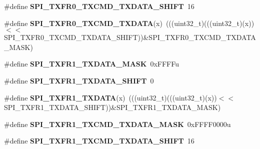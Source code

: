 \begin{DoxyCompactItemize}
\item 
\#define {\bfseries S\+P\+I\+\_\+\+T\+X\+F\+R0\+\_\+\+T\+X\+C\+M\+D\+\_\+\+T\+X\+D\+A\+T\+A\+\_\+\+S\+H\+I\+FT}~16\hypertarget{group__SPI__Register__Masks_gad5b1e75e9410e41d3c81384798040284}{}\label{group__SPI__Register__Masks_gad5b1e75e9410e41d3c81384798040284}

\item 
\#define {\bfseries S\+P\+I\+\_\+\+T\+X\+F\+R0\+\_\+\+T\+X\+C\+M\+D\+\_\+\+T\+X\+D\+A\+TA}(x)~(((uint32\+\_\+t)(((uint32\+\_\+t)(x))$<$$<$S\+P\+I\+\_\+\+T\+X\+F\+R0\+\_\+\+T\+X\+C\+M\+D\+\_\+\+T\+X\+D\+A\+T\+A\+\_\+\+S\+H\+I\+FT))\&S\+P\+I\+\_\+\+T\+X\+F\+R0\+\_\+\+T\+X\+C\+M\+D\+\_\+\+T\+X\+D\+A\+T\+A\+\_\+\+M\+A\+SK)\hypertarget{group__SPI__Register__Masks_ga7534e83201b7ea6c7beb55f2ed16ecaa}{}\label{group__SPI__Register__Masks_ga7534e83201b7ea6c7beb55f2ed16ecaa}

\item 
\#define {\bfseries S\+P\+I\+\_\+\+T\+X\+F\+R1\+\_\+\+T\+X\+D\+A\+T\+A\+\_\+\+M\+A\+SK}~0x\+F\+F\+F\+Fu\hypertarget{group__SPI__Register__Masks_ga1264b5c9bd3d50782925741457405b2d}{}\label{group__SPI__Register__Masks_ga1264b5c9bd3d50782925741457405b2d}

\item 
\#define {\bfseries S\+P\+I\+\_\+\+T\+X\+F\+R1\+\_\+\+T\+X\+D\+A\+T\+A\+\_\+\+S\+H\+I\+FT}~0\hypertarget{group__SPI__Register__Masks_ga15dd2d0a8568bc36fed73be8a4cb24a0}{}\label{group__SPI__Register__Masks_ga15dd2d0a8568bc36fed73be8a4cb24a0}

\item 
\#define {\bfseries S\+P\+I\+\_\+\+T\+X\+F\+R1\+\_\+\+T\+X\+D\+A\+TA}(x)~(((uint32\+\_\+t)(((uint32\+\_\+t)(x))$<$$<$S\+P\+I\+\_\+\+T\+X\+F\+R1\+\_\+\+T\+X\+D\+A\+T\+A\+\_\+\+S\+H\+I\+FT))\&S\+P\+I\+\_\+\+T\+X\+F\+R1\+\_\+\+T\+X\+D\+A\+T\+A\+\_\+\+M\+A\+SK)\hypertarget{group__SPI__Register__Masks_ga7f5fddb0dfde74876bf4b6ff4603dd56}{}\label{group__SPI__Register__Masks_ga7f5fddb0dfde74876bf4b6ff4603dd56}

\item 
\#define {\bfseries S\+P\+I\+\_\+\+T\+X\+F\+R1\+\_\+\+T\+X\+C\+M\+D\+\_\+\+T\+X\+D\+A\+T\+A\+\_\+\+M\+A\+SK}~0x\+F\+F\+F\+F0000u\hypertarget{group__SPI__Register__Masks_ga03437d9c36165cd76cc1b649bc61fdcd}{}\label{group__SPI__Register__Masks_ga03437d9c36165cd76cc1b649bc61fdcd}

\item 
\#define {\bfseries S\+P\+I\+\_\+\+T\+X\+F\+R1\+\_\+\+T\+X\+C\+M\+D\+\_\+\+T\+X\+D\+A\+T\+A\+\_\+\+S\+H\+I\+FT}~16\hypertarget{group__SPI__Register__Masks_ga0240ff4345642a5bca2308c670c5a980}{}\label{group__SPI__Register__Masks_ga0240ff4345642a5bca2308c670c5a980}


\end{DoxyCompactItemize}

